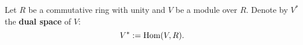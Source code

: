 \begin{notation}
  Let $R$ be a commutative ring with unity and $V$ be a module over $R$.
  Denote by $V^*$ the \textbf{dual space} of $V$:
  \begin{equation}
    V^* := \mathop{\rm Hom}\nolimits(V, R).
  \end{equation}
\end{notation}
